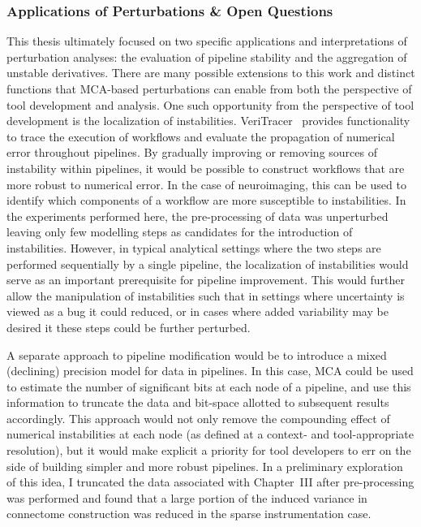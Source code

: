 \subsubsection{Applications of Perturbations \& Open Questions}

This thesis ultimately focused on two specific applications and interpretations of perturbation analyses: the
evaluation of pipeline stability and the aggregation of unstable derivatives. There are many possible extensions to
this work and distinct functions that MCA-based perturbations can enable from both the perspective of tool
development and analysis. One such opportunity from the perspective of tool development is the localization of
instabilities. VeriTracer~\cite{chatelain2018veritracer} provides functionality to trace the execution of
workflows and evaluate the propagation of numerical error throughout pipelines. By gradually improving or
removing sources of instability within pipelines, it would be possible to construct workflows that are more
robust to numerical error. In the case of neuroimaging, this can be used to identify which components of a
workflow are more susceptible to instabilities. In the experiments performed here, the pre-processing of data was
unperturbed leaving only few modelling steps as candidates for the introduction of instabilities. However, in
typical analytical settings where the two steps are performed sequentially by a single pipeline, the localization
of instabilities would serve as an important prerequisite for pipeline improvement. This would further allow the
manipulation of instabilities such that in settings where uncertainty is viewed as a bug it could reduced, or in
cases where added variability may be desired it these steps could be further perturbed.

A separate approach to pipeline modification would be to introduce a mixed (declining) precision model for
data in pipelines. In this case, MCA could be used to estimate the number of significant bits at each node of
a pipeline, and use this information to truncate the data and bit-space allotted to subsequent results accordingly.
This approach would not only remove the compounding effect of numerical instabilities at each node (as defined at a
context- and tool-appropriate resolution), but it would make explicit a priority for tool developers to err on
the side of building simpler and more robust pipelines. In a preliminary exploration of this idea, I truncated the
data associated with Chapter~III after pre-processing was performed and found that a large portion of the induced
variance in connectome construction was reduced in the sparse instrumentation case.

